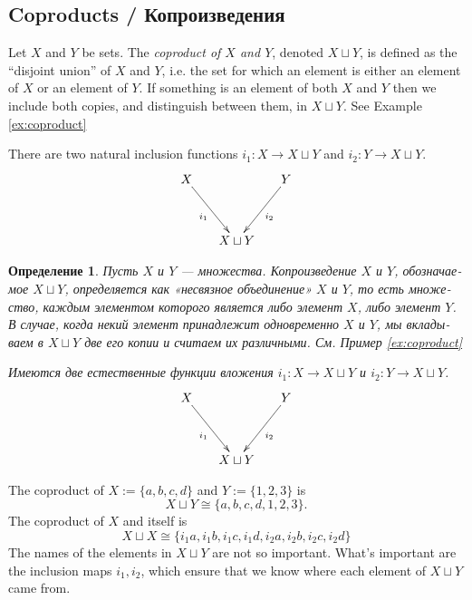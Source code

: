 \documentclass[a4paper]{book}
\def\to{\rightarrow}
\def\taking{\colon}
\def\iso{\cong}
\theoremstyle{myth}
\newtheorem{exampleENG}[envENG]{\begin{english}Example\end{english}}
\newtheorem{definitionENG}[envENG]{\begin{english}Definition\end{english}}
\newtheorem{definitionRUS}[envRUS]{Определение}
\begin{document}
\begin{russian}

\subsection{Coproducts / Копроизведения}\label{sec:coproducts}

\begin{definitionENG}\label{def:coproduct}
Let $X$ and $Y$ be sets. The {\em coproduct of $X$ and $Y$}, denoted $X\sqcup Y$, is defined as the “disjoint union” of $X$ and $Y$, i.e. the set for which an element is either an element of $X$ or an element of $Y$. If something is an element of both $X$ and $Y$ then we include both copies, and distinguish between them, in $X\sqcup Y$. See Example \ref{ex:coproduct}

There are two natural inclusion functions $i_1\taking X\to X\sqcup Y$ and $i_2\taking Y\to X\sqcup Y$.
$$\xymatrix@=15pt{X\ar[ddr]_{i_1}&&Y\ar[ddl]^{i_2}\\\\&X\sqcup Y}$$
\end{definitionENG}

\begin{definitionRUS}\label{def:coproduct}
Пусть $X$ и $Y$ — множества. {\em Копроизведение $X$ и $Y$}, обозначаемое $X\sqcup Y$, определяется как «несвязное объединение» $X$ и $Y$, то есть множество, каждым элементом которого является либо элемент $X$, либо элемент $Y$. В случае, когда некий элемент принадлежит одновременно $X$ и $Y$, мы вкладываем в $X\sqcup Y$ две его копии и считаем их различными. См. Пример \ref{ex:coproduct}

Имеются две естественные {\em функции вложения} $i_1\taking X\to X\sqcup Y$ и $i_2\taking Y\to X\sqcup Y$.
$$\xymatrix@=15pt{X\ar[ddr]_{i_1}&&Y\ar[ddl]^{i_2}\\\\&X\sqcup Y}$$
\end{definitionRUS}

\begin{exampleENG}\label{ex:coproduct}
The coproduct of $X:=\{a,b,c,d\}$ and $Y:=\{1,2,3\}$ is $$X\sqcup Y\iso\{a,b,c,d,1,2,3\}.$$ The coproduct of $X$ and itself is $$X\sqcup X\iso\{i_1a,i_1b,i_1c,i_1d,i_2a,i_2b,i_2c,i_2d\}$$ 
The names of the elements in $X\sqcup Y$ are not so important. What's important are the inclusion maps $i_1,i_2$, which ensure that we know where each element of $X\sqcup Y$ came from.
\end{exampleENG}


\end{russian}
\end{document}

